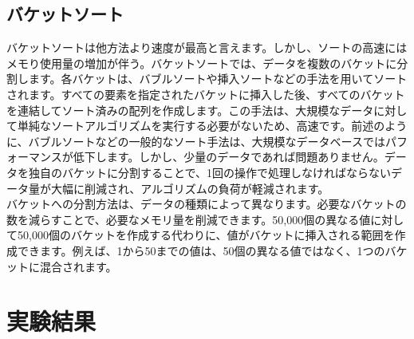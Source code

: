 \documentclass[a4j]{jarticle}
\begin{document}
\subsection{バケットソート}
バケットソートは他方法より速度が最高と言えます。しかし、ソートの高速にはメモり使用量の増加が伴う。バケットソートでは、データを複数のバケットに分割します。各バケットは、バブルソートや挿入ソートなどの手法を用いてソートされます。すべての要素を指定されたバケットに挿入した後、すべてのバケットを連結してソート済みの配列を作成します。この手法は、大規模なデータに対して単純なソートアルゴリズムを実行する必要がないため、高速です。前述のように、バブルソートなどの一般的なソート手法は、大規模なデータベースではパフォーマンスが低下します。しかし、少量のデータであれば問題ありません。データを独自のバケットに分割することで、1回の操作で処理しなければならないデータ量が大幅に削減され、アルゴリズムの負荷が軽減されます。\\
バケットへの分割方法は、データの種類によって異なります。必要なバケットの数を減らすことで、必要なメモリ量を削減できます。50,000個の異なる値に対して50,000個のバケットを作成する代わりに、値がバケットに挿入される範囲を作成できます。例えば、1から50までの値は、50個の異なる値ではなく、1つのバケットに混合されます。
\section{実験結果}
\end{document}
